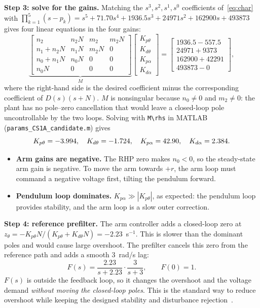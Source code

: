 \documentclass[11pt,a4paper]{article}
\begin{document}
\textbf{Step 3: solve for the gains.} Matching the $s^3,s^2,s^1,s^0$
coefficients of~\eqref{eq:char} with
$\prod_{k=1}^5(s-p_k)=s^5+71.70s^4+1936.5s^3+24971s^2+162900s+493873$
gives four linear equations in the four gains:
\begin{equation}
\underbrace{\begin{bmatrix}
n_2&n_2N&m_2&m_2N\\
n_1+n_2N&n_1N&m_2N&0\\
n_0+n_1N&n_0N&0&0\\
n_0N&0&0&0\end{bmatrix}}_{M}
\begin{bmatrix}K_{p\theta}\\K_{d\theta}\\K_{p\alpha}\\K_{d\alpha}\end{bmatrix}
=\begin{bmatrix}1936.5-557.5\\24971+9373\\162900+42291\\493873-0\end{bmatrix},
\end{equation}
where the right-hand side is the desired coefficient minus the
corresponding coefficient of $D(s)(s+N)$. $M$ is nonsingular because
$n_0\ne0$ and $m_2\ne0$: the plant has no pole--zero cancellation that
would leave a closed-loop pole uncontrollable by the two loops. Solving with
\texttt{M\textbackslash rhs} in MATLAB (\texttt{params\_CS1A\_candidate.m})
gives
\begin{equation}
K_{p\theta}=-3.994,\quad K_{d\theta}=-1.724,\quad
K_{p\alpha}=42.90,\quad K_{d\alpha}=2.384.
\end{equation}
\begin{itemize}[nosep]
\item \textbf{Arm gains are negative.} The RHP zero makes $n_0<0$, so
  the steady-state arm gain is negative. To move the arm towards $+r$, the
  arm loop must command a negative voltage first, tilting the pendulum
  forward.
\item \textbf{Pendulum loop dominates.} $K_{p\alpha}\gg|K_{p\theta}|$,
  as expected: the pendulum loop provides stability, and the arm loop is
  a slow outer correction.
\end{itemize}

\textbf{Step 4: reference prefilter.} The arm controller adds a closed-loop
zero at
$z_\theta=-K_{p\theta}N/(K_{p\theta}+K_{d\theta}N)=-2.23$~s$^{-1}$. This
is slower than the dominant poles and would cause large overshoot. The
prefilter cancels this zero from the reference path and adds a smooth
3~rad/s lag:
\begin{equation}
F(s)=\frac{2.23}{s+2.23}\cdot\frac{3}{s+3},\qquad F(0)=1.
\end{equation}
$F(s)$ is outside the feedback loop, so it changes the overshoot and the
voltage demand \emph{without moving the closed-loop poles}. This is the
standard way to reduce overshoot while keeping the designed stability and
disturbance rejection~\cite{franklin_feedback}.
\end{document}
